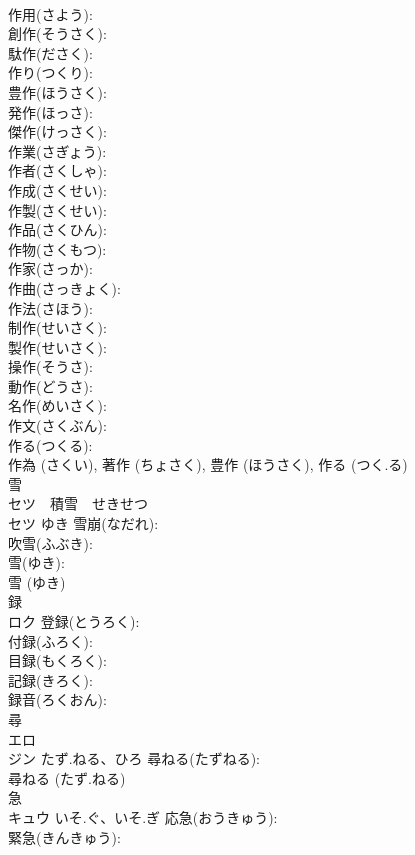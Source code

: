 \documentclass[8pt]{extreport}
\begin{document}
\begin{CJK}{UTF8}{min}
\\	作用(さよう): 
\\	創作(そうさく): 
\\	駄作(ださく): 
\\	作り(つくり): 
\\	豊作(ほうさく): 
\\	発作(ほっさ): 
\\	傑作(けっさく): 
\\	作業(さぎょう): 
\\	作者(さくしゃ): 
\\	作成(さくせい): 
\\	作製(さくせい): 
\\	作品(さくひん): 
\\	作物(さくもつ): 
\\	作家(さっか): 
\\	作曲(さっきょく): 
\\	作法(さほう): 
\\	制作(せいさく): 
\\	製作(せいさく): 
\\	操作(そうさ): 
\\	動作(どうさ): 
\\	名作(めいさく): 
\\	作文(さくぶん): 
\\	作る(つくる): 
\\	作為 (さくい), 著作 (ちょさく), 豊作 (ほうさく), 作る (つく.る)
\\	雪			
\\	セツ　積雪　せきせつ
\\	セツ	ゆき	雪崩(なだれ): 
\\	吹雪(ふぶき): 
\\	雪(ゆき): 
\\	雪 (ゆき)
\\	録			
\\	ロク		登録(とうろく): 
\\	付録(ふろく): 
\\	目録(もくろく): 
\\	記録(きろく): 
\\	録音(ろくおん): 
\\	尋			
\\	エロ 
\\	ジン	たず.ねる、ひろ	尋ねる(たずねる): 
\\	尋ねる (たず.ねる)
\\	急			
\\	キュウ	いそ.ぐ、いそ.ぎ	応急(おうきゅう): 
\\	緊急(きんきゅう): 

\end{CJK}
\end{document}
